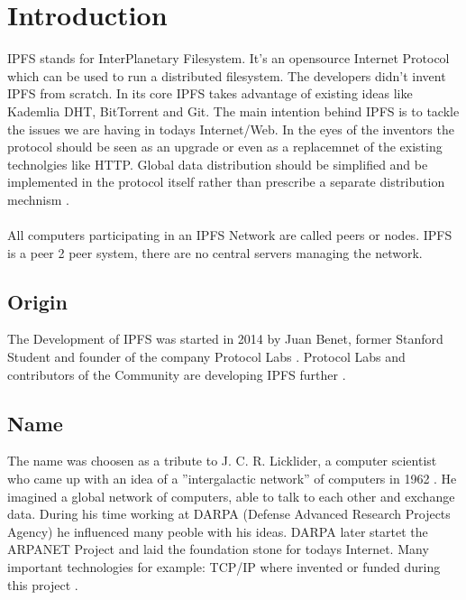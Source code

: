 \documentclass[a4paper,11pt, oneside]{report}
\theoremstyle{definition}
\begin{document}
\chapter{Introduction}
IPFS stands for InterPlanetary Filesystem. It's an opensource Internet Protocol which can be used to run a distributed filesystem.
The developers didn't invent IPFS from scratch. In its core IPFS takes advantage of existing ideas like Kademlia DHT, BitTorrent and Git. The main intention behind IPFS is to tackle the issues  we are having in todays Internet/Web. In the eyes of the inventors the protocol should be seen as an upgrade or even as a replacemnet of the existing technolgies like HTTP. Global data distribution should be simplified and be implemented in the protocol itself rather than prescribe a separate distribution mechnism \cite{IPFSBasics}.\\ \\
All computers participating in an IPFS Network are called peers or nodes. IPFS is a peer 2 peer system, there are no central servers managing the network.

\section{Origin}
The Development of IPFS was started in 2014 by Juan Benet, former Stanford Student and founder of the company Protocol Labs . Protocol Labs and contributors of the Community are developing IPFS further \cite{LinkedIn}.

\section{Name}
The name was choosen as a tribute to J. C. R. Licklider, a computer scientist who came up with an idea of a ''intergalactic network'' of computers in 1962 \cite{Tribute}. He imagined a global network of computers, able to talk to each other and exchange data. During his time working at DARPA (Defense Advanced Research Projects Agency) he influenced many peoble with his ideas. DARPA later startet the ARPANET Project and laid the foundation stone for todays Internet. Many important technologies for example: TCP/IP where invented or funded during this project \cite{JCR}. 

\newpage
\end{document}
